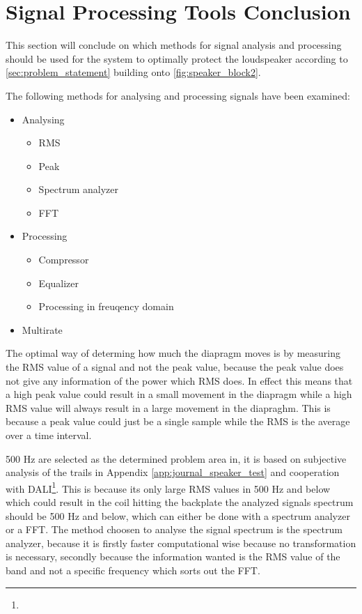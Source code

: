 \section{Signal Processing Tools Conclusion}
This section will conclude on which methods for signal analysis and processing should be used for the system to optimally protect the loudspeaker according to \autoref{sec:problem_statement} building onto \autoref{fig:speaker_block2}.

The following methods for analysing and processing signals have been examined:
\begin{itemize}
\item Analysing
\begin{itemize}
\item RMS
\item Peak
\item Spectrum analyzer
\item FFT
\end{itemize}
\item Processing
\begin{itemize}
\item Compressor
\item Equalizer
\item Processing in freuqency domain
\end{itemize}
\item Multirate
\end{itemize}

The optimal way of determing how much the diapragm moves is by measuring the RMS value of a signal and not the peak value, because the peak value does not give any information of the power which RMS does. In effect this means that a high peak value could result in a small movement in the diapragm while a high RMS value will always result in a large movement in the diapraghm. This is because a peak value could just be a single sample while the RMS is the average over a time interval. 

500 Hz are selected as the determined problem area in, it is based on subjective analysis of the trails in Appendix \autoref{app:journal_speaker_test} and cooperation with DALI\footnote{}. This is because its only large RMS values in 500 Hz and below which could result in the coil hitting the backplate the analyzed signals spectrum should be 500 Hz and below, which can either be done with a spectrum analyzer or a FFT. The method choosen to analyse the signal spectrum is the spectrum analyzer, because it is firstly faster computational wise because no transformation is necessary, secondly because the information wanted is the RMS value of the band and not a specific frequency which sorts out the FFT.   %

